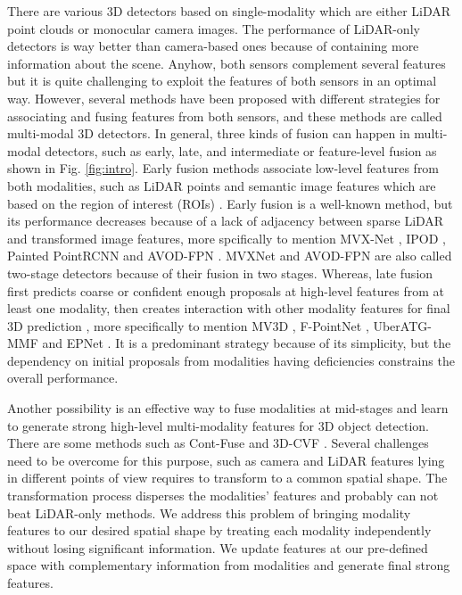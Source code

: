 \documentclass[10pt,twocolumn,letterpaper]{article}
\begin{document}
There are various 3D detectors based on single-modality which are either LiDAR point clouds or monocular camera images. The performance of LiDAR-only detectors \cite{graham2017submanifold,chen2022focal,yang2018pixor,yang2018hdnet,lang2019pointpillars,yan2018second,deng2021voxel,yin2021center}  is way better than camera-based ones \cite{brazil2019m3d, simonelli2019disentangling, wang2021fcos3d, huang2021bevdet, chen2020dsgn} because of containing more information about the scene. Anyhow, both sensors complement several features but it is quite challenging to exploit the features of both sensors in an optimal way. However, several methods have been proposed with different strategies for associating and fusing features from both sensors, and these methods are called multi-modal 3D detectors. In general, three kinds of fusion can happen in multi-modal detectors, such as early, late, and intermediate or feature-level fusion as shown in Fig. \ref{fig:intro}. Early fusion methods associate low-level features from both modalities, such as LiDAR points and semantic image features which are based on the region of interest (ROIs) \cite{liang2018deep,huang2020epnet,yin2021multimodal,li2022voxel}. Early fusion is a well-known method, but its performance decreases because of a lack of adjacency between sparse LiDAR and transformed image features, more spcifically to mention MVX-Net \cite{sindagi2019mvx}, IPOD \cite{yang2018ipod}, Painted PointRCNN \cite{vora2020pointpainting} and AVOD-FPN \cite{ku2018joint}.   
MVXNet and AVOD-FPN are also called two-stage detectors because of their fusion in two stages. 
Whereas, late fusion first predicts coarse or confident enough proposals at high-level features from at least one modality, then creates interaction with other modality features for final 3D prediction \cite{chen2017multi,ku2018joint,yoo20203d}, more specifically to mention MV3D \cite{chen2017multi}, F-PointNet \cite{qi2018frustum}, UberATG-MMF \cite{liang2019multi} and EPNet \cite{huang2020epnet}. It is a predominant strategy because of its simplicity, but the dependency on initial proposals from modalities having deficiencies constrains the overall performance.

Another possibility is an effective way to fuse modalities at mid-stages and learn to generate strong high-level multi-modality features for 3D object detection. There are some methods such as Cont-Fuse\cite{liang2018deep} and 3D-CVF \cite{yoo20203d} . Several challenges need to be overcome for this purpose, such as camera and LiDAR features lying in different points of view requires to transform to a common spatial shape. The transformation process disperses the modalities' features and probably can not beat LiDAR-only methods. We address this problem of bringing modality features to our desired spatial shape by treating each modality independently without losing significant information. We update features at our pre-defined space with complementary information from modalities and generate final strong features. 
\end{document}
